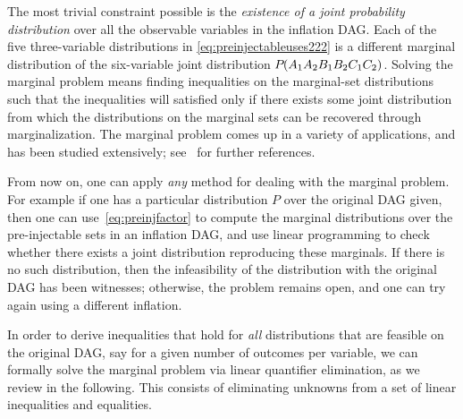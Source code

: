 \label{step:marginalsproblem}\par\smallskip\nobreak

The most trivial constraint possible 
is the \emph{existence of a joint probability distribution} over all the observable variables in the inflation DAG. Each of the five three-variable distributions in \cref{eq:preinjectableuses222} is a different marginal distribution of the six-variable joint distribution ${P_{}}\lparen A_1 A_2 B_1 B_2 C_1 C_2\rparen$. Solving the marginal problem means finding inequalities on the marginal-set distributions such that the inequalities will satisfied only if there exists some joint distribution from which the distributions on the marginal sets can be recovered through marginalization. The marginal problem comes up in a variety of applications, and has been studied extensively; see~\cite{fritz2013marginal} for further references.  


From now on, one can apply \emph{any} method for dealing with the marginal problem. For example if one has a particular distribution $P$ over the original DAG given, then one can use~\cref{eq:preinjfactor} to compute the marginal distributions over the pre-injectable sets in an inflation DAG, and use linear programming to check whether there exists a joint distribution reproducing these marginals. If there is no such distribution, then the infeasibility of the distribution with the original DAG has been witnesses; otherwise, the problem remains open, and one can try again using a different inflation.

In order to derive inequalities that hold for \emph{all} distributions that are feasible on the original DAG, say for a given number of outcomes per variable, we can formally solve the marginal problem via linear quantifier elimination, as we review in the following. This consists of eliminating unknowns from a set of linear inequalities and equalities.


